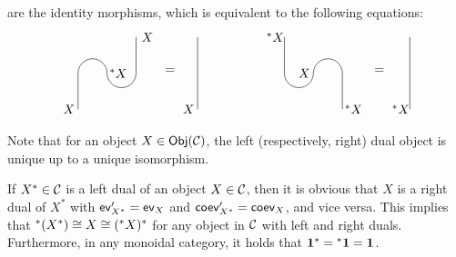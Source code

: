 \begin{defn}
\begin{align}
		\end{align}
		are the identity morphisms, which is equivalent to the following equations:
			\begin{align}
				\begin{tikzpicture}[baseline=(current bounding box.center)]
					\draw (0,0) -- (0,1);
					\draw (0,1) arc (180:0:0.4);
					\draw (0.8,1) arc (-180:0:0.4);
					\draw (1.6,1) -- (1.6,2);
					\node at (-0.25,0) {$X$};
					\node at (1.85,2) {$\ X$};
					\node at (1.05,1) {$\ \lstar X$};
				\end{tikzpicture}\ =
				\begin{tikzpicture}[baseline=(current bounding box.center)]
					\draw (0,0) -- (0,2);
					\node at (-0.25,0)  {$X$};
					\node at (-0.25,2) {\phantom{$X$}};
				\end{tikzpicture}\hspace{50pt}
				\begin{tikzpicture}[baseline=(current bounding box.center)]
					\draw (0,0) -- (0,1);
					\draw (0,1) arc (0:180:0.4);
					\draw (-0.8,1) arc (0:-180:0.4);
					\draw (-1.6,1) -- (-1.6,2);
					\node at (0.25,0) {$\ \lstar X$};
					\node at (-1.85,2) {$\lstar X$};
					\node at (-1.05,1) {$X$};
				\end{tikzpicture}\ =
				\begin{tikzpicture}[baseline=(current bounding box.center)]
					\draw (0,0) -- (0,2);
					\node at (-0.25,0)  {$\lstar X$};
					\node at (-0.25,2) {\phantom{$\lstar X$}};
				\end{tikzpicture}
			\end{align}
	\end{defn}

	\begin{rem}
		Note that for an object $X\in\mathsf{Obj}({\mathcal{C}})$, the left (respectively, right) dual object is unique up to a unique isomorphism.
	\end{rem}

	\begin{rem}
		If $X^*\in{\mathcal{C}}$ is a left dual of an object $X\in{\mathcal{C}}$, then it is obvious that $X$ is a right dual of $X^*$ with $\mathsf{ev}'_{X^*}=\mathsf{ev}_X$ and $\mathsf{coev}'_{X^*}=\mathsf{coev}_X$, and vice versa. This implies that $\ {}\!\!^* (X^*)\cong X\cong (\ {}\!\!^* X)^*$ for any object in ${\mathcal{C}}$ with left and right duals. Furthermore, in any monoidal category, it holds that $\mathbf{1}^*=\ {}\!\!^* \mathbf{1}=\mathbf{1}$.
	\end{rem}


